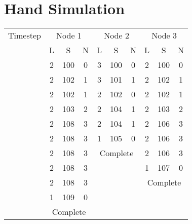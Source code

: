 \documentclass{article}
\newcounter{magicrownumbers}
\newcommand\rownumber{\stepcounter{magicrownumbers}\arabic{magicrownumbers}}
\begin{document}
\section*{Hand Simulation}
\begin{center}
\begin{tabular}{| c | c | c | c | c | c | c | c | c | c |}
	\hline
    Timestep & \multicolumn{3}{|c|}{Node 1} & \multicolumn{3}{|c|}{Node 2} & \multicolumn{3}{|c|}{Node 3} \\
    \cline{2-10}
      & L & S & N & L & S & N & L & S & N \\
    \hline
    \rownumber & 2 & 100 & 0 & 3 & 100 & 0 & 2 & 100 & 0 \\
    \hline
    \rownumber & 2 & 102 & 1 & 3 & 101 & 1 & 2 & 102 & 1 \\
    \hline
    \rownumber & 2 & 102 & 1 & 2 & 102 & 0 & 2 & 102 & 1 \\
    \hline
    \rownumber & 2 & 103 & 2 & 2 & 104 & 1 & 2 & 103 & 2 \\
    \hline
    \rownumber & 2 & 108 & 3 & 2 & 104 & 1 & 2 & 106 & 3 \\
    \hline
    \rownumber & 2 & 108 & 3 & 1 & 105 & 0 & 2 & 106 & 3 \\
    \hline
    \rownumber & 2 & 108 & 3 & \multicolumn{3}{|c|}{Complete} & 2 & 106 & 3 \\
    \cline{1-4} \cline{8-10}
    \rownumber & 2 & 108 & 3 & \multicolumn{3}{|c|}{} & 1 & 107 & 0 \\
    \cline{1-4} \cline{8-10}
    \rownumber & 2 & 108 & 3 & \multicolumn{3}{|c|}{} & \multicolumn{3}{|c|}{Complete} \\
    \cline{1-4}
    \rownumber & 1 & 109 & 0 & \multicolumn{3}{|c|}{} & \multicolumn{3}{|c|}{} \\
    \cline{1-4}
    \rownumber & \multicolumn{3}{|c|}{Complete} & \multicolumn{3}{|c|}{} & \multicolumn{3}{|c|}{} \\
    \hline
\end{tabular}
\end{center}
	
\end{document}
